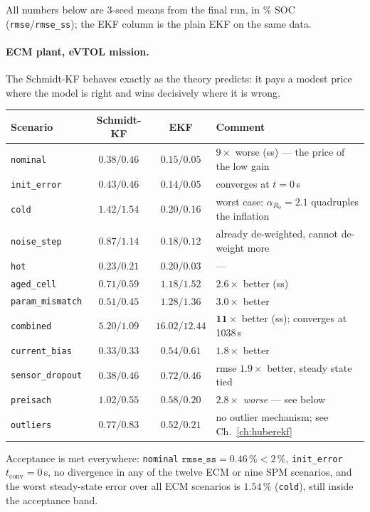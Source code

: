 All numbers below are 3-seed means from the final run, in \% SOC
(\texttt{rmse}/\texttt{rmse\_ss}); the EKF column is the plain EKF on the same data.

\paragraph{ECM plant, eVTOL mission.}
The Schmidt-KF behaves exactly as the theory predicts: it pays a modest price where the model is
right and wins decisively where it is wrong.
\begin{center}\small
\begin{tabular}{@{}lccl@{}}
\toprule
Scenario & Schmidt-KF & EKF & Comment\\
\midrule
\texttt{nominal}        & $0.38/0.46$ & $0.15/0.05$ & $9\times$ worse (ss) --- the price of the low gain\\
\texttt{init\_error}    & $0.43/0.46$ & $0.14/0.05$ & converges at $t=0$\,s\\
\texttt{cold}           & $1.42/1.54$ & $0.20/0.16$ & worst case: $\alpha_{R_0}=2.1$ quadruples the inflation\\
\texttt{noise\_step}    & $0.87/1.14$ & $0.18/0.12$ & already de-weighted, cannot de-weight more\\
\texttt{hot}            & $0.23/0.21$ & $0.20/0.03$ & ---\\
\texttt{aged\_cell}     & $\mathbf{0.71/0.59}$ & $1.18/1.52$ & $\mathbf{2.6\times}$ better (ss)\\
\texttt{param\_mismatch}& $\mathbf{0.51/0.45}$ & $1.28/1.36$ & $\mathbf{3.0\times}$ better\\
\texttt{combined}       & $\mathbf{5.20/1.09}$ & $16.02/12.44$ & $\mathbf{11\times}$ better (ss); converges at 1038\,s\\
\texttt{current\_bias}  & $\mathbf{0.33/0.33}$ & $0.54/0.61$ & $1.8\times$ better\\
\texttt{sensor\_dropout}& $0.38/0.46$ & $0.72/0.46$ & rmse $1.9\times$ better, steady state tied\\
\texttt{preisach}       & $1.02/0.55$ & $0.58/0.20$ & $2.8\times$ \emph{worse} --- see below\\
\texttt{outliers}       & $0.77/0.83$ & $0.52/0.21$ & no outlier mechanism; see Ch.~\ref{ch:huberekf}\\
\bottomrule
\end{tabular}
\end{center}
Acceptance is met everywhere: \texttt{nominal} $\texttt{rmse\_ss}=0.46\,\%<2\,\%$,
\texttt{init\_error} $t_\mathrm{conv}=0$\,s, no divergence in any of the twelve ECM or nine SPM
scenarios, and the worst steady-state error over all ECM scenarios is $1.54\,\%$ (\texttt{cold}),
still inside the acceptance band.

